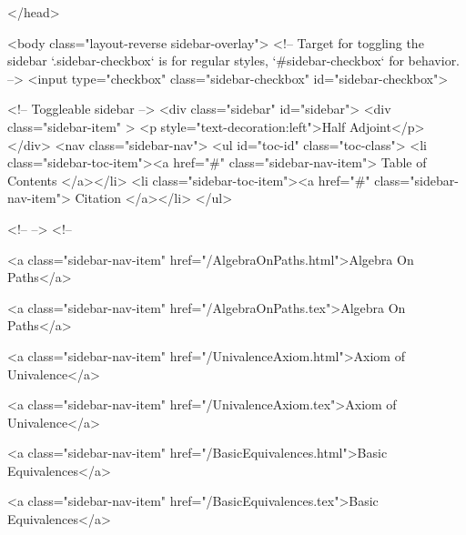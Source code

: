   
</head>




  <body class="layout-reverse sidebar-overlay">
    <!-- Target for toggling the sidebar `.sidebar-checkbox` is for regular
     styles, `#sidebar-checkbox` for behavior. -->
<input type="checkbox" class="sidebar-checkbox" id="sidebar-checkbox">

<!-- Toggleable sidebar -->
<div class="sidebar" id="sidebar">
  <div class="sidebar-item" >
    <p style="text-decoration:left">Half Adjoint</p>
  </div>
  <nav class="sidebar-nav">
    <ul id="toc-id" class="toc-class">
  <li class="sidebar-toc-item"><a href="#" class="sidebar-nav-item"> Table of Contents </a></li>
  <li class="sidebar-toc-item"><a href="#" class="sidebar-nav-item"> Citation </a></li>
</ul>


    <!--  -->
    <!-- 
      
    
      
    
      
    
      
    
      
        
      
    
      
        
          <a class="sidebar-nav-item" href="/AlgebraOnPaths.html">Algebra On Paths</a>
        
      
    
      
        
          <a class="sidebar-nav-item" href="/AlgebraOnPaths.tex">Algebra On Paths</a>
        
      
    
      
        
          <a class="sidebar-nav-item" href="/UnivalenceAxiom.html">Axiom of Univalence</a>
        
      
    
      
        
          <a class="sidebar-nav-item" href="/UnivalenceAxiom.tex">Axiom of Univalence</a>
        
      
    
      
        
          <a class="sidebar-nav-item" href="/BasicEquivalences.html">Basic Equivalences</a>
        
      
    
      
        
          <a class="sidebar-nav-item" href="/BasicEquivalences.tex">Basic Equivalences</a>
        

